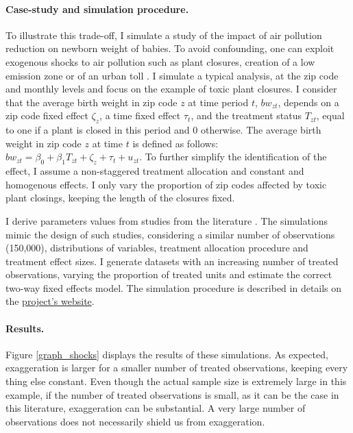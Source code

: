 \documentclass[usletter, 12pt]{article}
\begin{document}
			\paragraph{Case-study and simulation procedure.} %
			To illustrate this trade-off, I simulate a study of the impact of air pollution reduction on newborn weight of babies. To avoid confounding, one can exploit exogenous shocks to air pollution such as plant closures, creation of a low emission zone or of an urban toll \citep{currie_environmental_2015, lavaine_energy_2017}. I simulate a typical analysis, at the zip code and monthly levels and focus on the example of toxic plant closures. I consider that the average birth weight in zip code $z$ at time period $t$, $bw_{zt}$, depends on a zip code fixed effect $\zeta_z$, a time fixed effect $\tau_t$, and the treatment status $T_{zt}$, equal to one if a plant is closed in this period and 0 otherwise. The average birth weight in zip code $z$ at time $t$ is defined as follows: $bw_{zt} = \beta_0 + \beta_1 T_{zt} + \zeta_z + \tau_t + u_{zt}$. To further simplify the identification of the effect, I assume a non-staggered treatment allocation and constant and homogenous effects. I only vary the proportion of zip codes affected by toxic plant closings, keeping the length of the closures fixed.

       I derive parameters values from studies from the literature \citep{currie_environmental_2015, lavaine_energy_2017}. The simulations mimic the design of such studies, considering a similar number of observations (150,000), distributions of variables, treatment allocation procedure and treatment effect sizes. I generate datasets with an increasing number of treated observations, varying the proportion of treated units and estimate the correct two-way fixed effects model. The simulation procedure is described in details on the \href{https://vincentbagilet.github.io/causal_exaggeration/shocks.html}{project's website}.
        
			\paragraph{Results.} Figure \ref{graph_shocks} displays the results of these simulations. As expected, exaggeration is larger for a smaller number of treated observations, keeping every thing else constant. Even though the actual sample size is extremely large in this example, if the number of treated observations is small, as it can be the case in this literature, exaggeration can be substantial. A very large number of observations does not necessarily shield us from exaggeration. 
\end{document}
